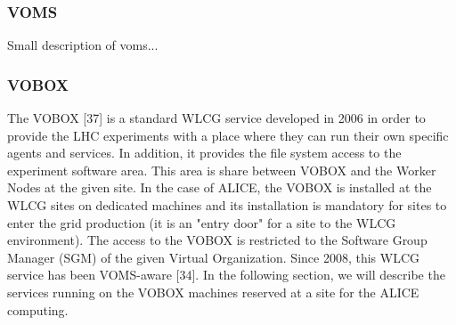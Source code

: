 \subsubsection{VOMS}
Small description of voms...

\subsubsection{VOBOX}
%
The VOBOX [37] is a standard WLCG service developed in 2006 in order
to provide the LHC experiments with a place where they can run their
own specific agents and services. In addition, it
provides the file system access to the experiment software area.
This area is share between VOBOX and the Worker Nodes at the given
site.  In the case of ALICE, the VOBOX is installed at the WLCG sites on dedicated machines
and its installation is mandatory for sites to enter the grid
production (it is an "entry door" for a site to the WLCG
environment). The access to the VOBOX is restricted to the Software
Group Manager (SGM) of the given Virtual Organization. Since 2008,
this WLCG service has been VOMS-aware [34]. In the following
section, we will describe the services running on the VOBOX machines
reserved at a site for the ALICE computing.

